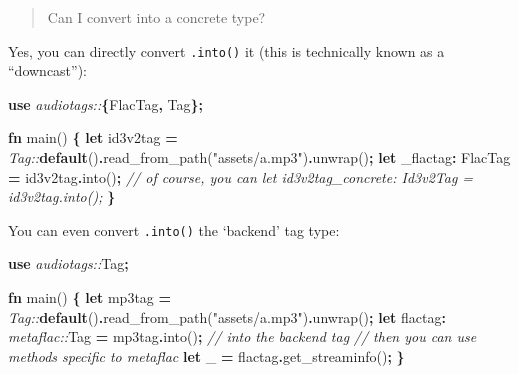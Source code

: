 \documentclass[
]{book}
\newenvironment{Shaded}{\begin{snugshade}}{\end{snugshade}}
\newcommand{\CommentTok}[1]{\textcolor[rgb]{0.56,0.35,0.01}{\textit{#1}}}
\newcommand{\KeywordTok}[1]{\textcolor[rgb]{0.13,0.29,0.53}{\textbf{#1}}}
\newcommand{\NormalTok}[1]{#1}
\newcommand{\OperatorTok}[1]{\textcolor[rgb]{0.81,0.36,0.00}{\textbf{#1}}}
\newcommand{\PreprocessorTok}[1]{\textcolor[rgb]{0.56,0.35,0.01}{\textit{#1}}}
\newcommand{\StringTok}[1]{\textcolor[rgb]{0.31,0.60,0.02}{#1}}
\begin{document}
\begin{quote}
Can I convert into a concrete type?
\end{quote}

Yes, you can directly convert \texttt{.into()} it (this is technically known as a ``downcast''):

\begin{Shaded}
\begin{Highlighting}[]
\KeywordTok{use} \PreprocessorTok{audiotags::}\OperatorTok{\{}\NormalTok{FlacTag}\OperatorTok{,}\NormalTok{ Tag}\OperatorTok{\};}

\KeywordTok{fn}\NormalTok{ main() }\OperatorTok{\{}
    \KeywordTok{let}\NormalTok{ id3v2tag }\OperatorTok{=} \PreprocessorTok{Tag::}\KeywordTok{default}\NormalTok{()}\OperatorTok{.}\NormalTok{read\_from\_path(}\StringTok{"assets/a.mp3"}\NormalTok{)}\OperatorTok{.}\NormalTok{unwrap()}\OperatorTok{;}
    \KeywordTok{let}\NormalTok{ \_flactag}\OperatorTok{:}\NormalTok{ FlacTag }\OperatorTok{=}\NormalTok{ id3v2tag}\OperatorTok{.}\NormalTok{into()}\OperatorTok{;}
    \CommentTok{// of course, you can \textasciigrave{}let id3v2tag\_concrete: Id3v2Tag = id3v2tag.into();\textasciigrave{}}
\OperatorTok{\}}
\end{Highlighting}
\end{Shaded}

You can even convert \texttt{.into()} the `backend' tag type:

\begin{Shaded}
\begin{Highlighting}[]
\KeywordTok{use} \PreprocessorTok{audiotags::}\NormalTok{Tag}\OperatorTok{;}

\KeywordTok{fn}\NormalTok{ main() }\OperatorTok{\{}
    \KeywordTok{let}\NormalTok{ mp3tag }\OperatorTok{=} \PreprocessorTok{Tag::}\KeywordTok{default}\NormalTok{()}\OperatorTok{.}\NormalTok{read\_from\_path(}\StringTok{"assets/a.mp3"}\NormalTok{)}\OperatorTok{.}\NormalTok{unwrap()}\OperatorTok{;}
    \KeywordTok{let}\NormalTok{ flactag}\OperatorTok{:} \PreprocessorTok{metaflac::}\NormalTok{Tag }\OperatorTok{=}\NormalTok{ mp3tag}\OperatorTok{.}\NormalTok{into()}\OperatorTok{;} \CommentTok{// into the \textquotesingle{}backend\textquotesingle{} tag}
    \CommentTok{// then you can use methods specific to metaflac}
    \KeywordTok{let}\NormalTok{ \_ }\OperatorTok{=}\NormalTok{ flactag}\OperatorTok{.}\NormalTok{get\_streaminfo()}\OperatorTok{;}
\OperatorTok{\}}
\end{Highlighting}
\end{Shaded}
\end{document}
